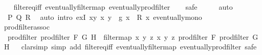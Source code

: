 \begin{isabellebody}
%
\isadelimproof
\ \ %
\endisadelimproof
%
\isatagproof
{}\isamarkupfalse%
\ filter{\isacharunderscore}{\kern0pt}eq{\isacharunderscore}{\kern0pt}iff\ eventually{\isacharunderscore}{\kern0pt}filtermap\ eventually{\isacharunderscore}{\kern0pt}prod{\isacharunderscore}{\kern0pt}filter\isanewline
\ \ \isamarkupfalse%
\ safe\isanewline
\ \ \isamarkupfalse%
\ \isamarkupfalse%
\ auto\isanewline
\ \ \isamarkupfalse%
\ \ P\ Q\ R\ \ \isamarkupfalse%
{\isacharparenleft}{\kern0pt}auto\ intro{\isacharcolon}{\kern0pt}\ exI{\isacharbrackleft}{\kern0pt}\ x{\isacharequal}{\kern0pt}{\isachardoublequoteopen}{\isasymlambda}y{\isachardot}{\kern0pt}\ {\isasymexists}x{\isachardot}{\kern0pt}\ y\ {\isacharequal}{\kern0pt}\ g\ x\ {\isasymand}\ R\ x{\isachardoublequoteclose}{\isacharbrackright}{\kern0pt}\ eventually{\isacharunderscore}{\kern0pt}mono{\isacharparenright}{\kern0pt}\isanewline
\ \ \isamarkupfalse%
%
\endisatagproof
{\isafoldproof}%
%
\isadelimproof
\isanewline
%
\endisadelimproof
\isanewline
{}\isamarkupfalse%
\ prod{\isacharunderscore}{\kern0pt}filter{\isacharunderscore}{\kern0pt}assoc{\isacharcolon}{\kern0pt}\isanewline
\ \ {\isachardoublequoteopen}prod{\isacharunderscore}{\kern0pt}filter\ {\isacharparenleft}{\kern0pt}prod{\isacharunderscore}{\kern0pt}filter\ F\ G{\isacharparenright}{\kern0pt}\ H\ {\isacharequal}{\kern0pt}\ filtermap\ {\isacharparenleft}{\kern0pt}{\isasymlambda}{\isacharparenleft}{\kern0pt}x{\isacharcomma}{\kern0pt}\ y{\isacharcomma}{\kern0pt}\ z{\isacharparenright}{\kern0pt}{\isachardot}{\kern0pt}\ {\isacharparenleft}{\kern0pt}{\isacharparenleft}{\kern0pt}x{\isacharcomma}{\kern0pt}\ y{\isacharparenright}{\kern0pt}{\isacharcomma}{\kern0pt}\ z{\isacharparenright}{\kern0pt}{\isacharparenright}{\kern0pt}\ {\isacharparenleft}{\kern0pt}prod{\isacharunderscore}{\kern0pt}filter\ F\ {\isacharparenleft}{\kern0pt}prod{\isacharunderscore}{\kern0pt}filter\ G\ H{\isacharparenright}{\kern0pt}{\isacharparenright}{\kern0pt}{\isachardoublequoteclose}\isanewline
%
\isadelimproof
\ \ %
\endisadelimproof
%
\isatagproof
{}\isamarkupfalse%
{\isacharparenleft}{\kern0pt}clarsimp\ simp\ add{\isacharcolon}{\kern0pt}\ filter{\isacharunderscore}{\kern0pt}eq{\isacharunderscore}{\kern0pt}iff\ eventually{\isacharunderscore}{\kern0pt}filtermap\ eventually{\isacharunderscore}{\kern0pt}prod{\isacharunderscore}{\kern0pt}filter{\isacharsemicolon}{\kern0pt}\ safe{\isacharparenright}{\kern0pt}\isanewline

\end{isabellebody}
